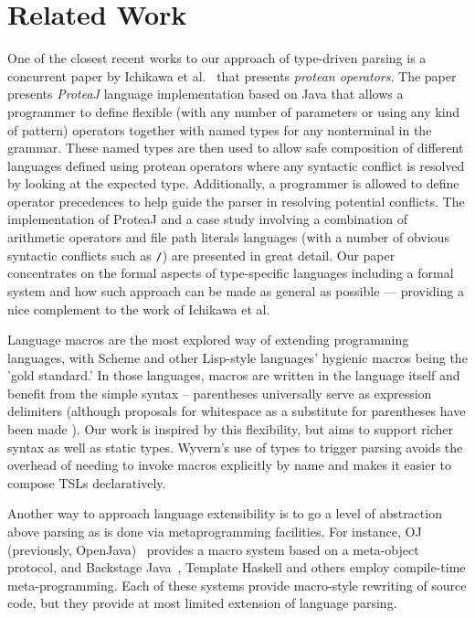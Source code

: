 \section{Related Work}
\label{s:related}

One of the closest recent works to our approach of type-driven parsing is a concurrent paper by Ichikawa et al.~\cite{Ichikawa:2014:CUO:2584469.2577092} that presents \textit{protean operators}. The paper presents \textit{ProteaJ} language implementation based on Java that allows a programmer to define flexible (with any number of parameters or using any kind of pattern) operators together with named types for any nonterminal in the grammar. These named types are then used to allow safe composition of different languages defined using protean operators where any syntactic conflict is resolved by looking at the expected type. Additionally, a programmer is allowed to define operator precedences to help guide the parser in resolving potential conflicts. The implementation of ProteaJ and a case study involving a combination of arithmetic operators and file path literals languages (with a number of obvious syntactic conflicts such as \lstinline{/}) are presented in great detail. Our paper concentrates on the formal aspects of type-specific languages including a formal system and how such approach can be made as general as possible --- providing a nice complement to the work of Ichikawa et al.


Language macros are the most explored way of extending programming languages, with Scheme and other Lisp-style languages' hygienic macros being the 'gold standard.' In those languages, macros are written in the language itself and benefit from the simple syntax -- parentheses universally serve as expression delimiters (although proposals for whitespace as a substitute for parentheses have been made \cite{srfi-49}). Our work is inspired by this flexibility, but aims to support richer syntax as well as static types. Wyvern's use of types to trigger parsing  avoids the overhead of needing to invoke macros explicitly by name and makes it easier to compose TSLs declaratively.

Another way to approach language extensibility is to go a level of abstraction above parsing as is done via metaprogramming facilities. For instance, OJ (previously, OpenJava)~\cite{Tatsubori00openjava:a} provides a macro system based on a meta-object protocol, and Backstage Java~\cite{Palmer:2011:BJM:2048066.2048137}, Template Haskell \cite{sheard2002template} and others employ compile-time meta-programming.  Each of these systems provide macro-style rewriting of source code, but they provide at most limited extension of language parsing.

